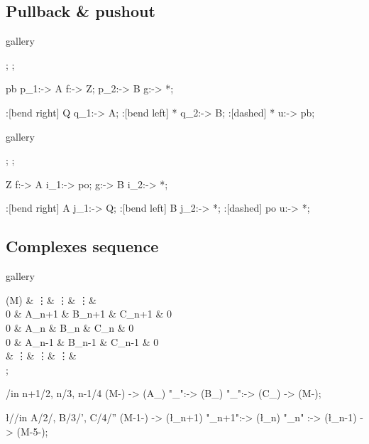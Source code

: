 \clearpage

\subsection{Pullback \& pushout}

\begin{tcblisting}{gallery}
\begin{kodi}[comb]
  ;
  ;

  \mor[swap] pb p_1:-> A f:-> Z;
  \mor        * p_2:-> B g:-> *;

  \mor[swap]:[bend right] Q q_1:-> A;
  \mor      :[bend left]  * q_2:-> B;
  \mor [mid]:[dashed]     *   u:-> pb;
\end{kodi}
\end{tcblisting}

\begin{tcblisting}{gallery}
\begin{kodi}[comb]
  ;
  ;

  \mor[swap] Z f:-> A i_1:-> po;
  \mor       * g:-> B i_2:-> *;

  \mor[swap]:[bend right]  A j_1:-> Q;
  \mor      :[bend left]   B j_2:-> *;
  \mor [mid]:[dashed]     po   u:-> *;
\end{kodi}
\end{tcblisting}

\clearpage

\subsection{Complexes sequence}

\begin{tcblisting}{gallery}
\begin{kodi}
  \obj (M) {   & \vdots  & \vdots  & \vdots  &   \\
             0 & A_{n+1} & B_{n+1} & C_{n+1} & 0 \\
             0 & A_{n}   & B_{n}   & C_{n}   & 0 \\
             0 & A_{n-1} & B_{n-1} & C_{n-1} & 0 \\
               & \vdots  & \vdots  & \vdots  &   \\ };

  \foreach \n/\row in {n+1/2, n/3, n-1/4}
    \mor (M-) -> (A_{\n}) "\alpha_{\n}":-> (B_{\n})
                                 "\beta_{\n}":-> (C_{\n}) -> (M-);

  \foreach \l/\col/\q in {A/2/, B/3/', C/4/''}
    \mor (M-1-\col) -> (\l_{n+1}) "\partial\q_{n+1}":-> (\l_{n})
                                  "\partial\q_{n}"  :-> (\l_{n-1}) -> (M-5-\col);
\end{kodi}
\end{tcblisting}

